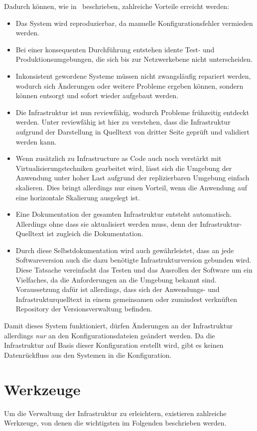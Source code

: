 Dadurch können, wie in~\autocite[64\psqq]{Wolff201604} beschrieben, zahlreiche Vorteile erreicht werden:
\begin{itemize}
    \item Das System wird reproduzierbar, da manuelle Konfigurationsfehler vermieden werden.
    \item Bei einer konsequenten Durchführung entstehen idente Test- und Produktionsumgebungen, die sich bis zur Netzwerkebene nicht unterscheiden.
    \item Inkonsistent gewordene Systeme müssen nicht zwangsläufig repariert werden, wodurch sich Änderungen oder weitere Probleme ergeben können, sondern können entsorgt und sofort wieder aufgebaut werden.
    \item Die Infrastruktur ist nun reviewfähig, wodurch Probleme frühzeitig entdeckt werden. Unter reviewfähig ist hier zu verstehen, dass die Infrastruktur aufgrund der Darstellung in Quelltext von dritter Seite geprüft und validiert werden kann.
    \item Wenn zusätzlich zu Infrastructure as Code auch noch verstärkt mit Virtualisierungstechniken gearbeitet wird, lässt sich die Umgebung der Anwendung unter hoher Last aufgrund der replizierbaren Umgebung einfach skalieren. Dies bringt allerdings nur einen Vorteil, wenn die Anwendung auf eine horizontale Skalierung ausgelegt ist.
    \item Eine Dokumentation der gesamten Infrastruktur entsteht automatisch. Allerdings ohne dass sie aktualisiert werden muss, denn der Infrastruktur-Quelltext ist zugleich die Dokumentation.
    \item Durch diese Selbstdokumentation wird auch gewährleistet, dass an jede Softwareversion auch die dazu benötigte Infrastrukturversion gebunden wird. Diese Tatsache vereinfacht das Testen und das Ausrollen der Software um ein Vielfaches, da die Anforderungen an die Umgebung bekannt sind. Voraussetzung dafür ist allerdings, dass sich der Anwendungs- und Infrastrukturquelltext in einem gemeinsamen oder zumindest verknüften Repository der Versionsverwaltung befinden.
\end{itemize}
Damit dieses System funktioniert, dürfen Änderungen an der Infrastruktur allerdings \emph{nur} an den Konfigurationsdateien geändert werden. Da die Infrastruktur auf Basis dieser Konfiguration erstellt wird, gibt es keinen Datenrückfluss aus den Systemen in die Konfiguration.


\section{Werkzeuge}
\label{sec:konfigurationswerkzeuge}
Um die Verwaltung der Infrastruktur zu erleichtern, existieren zahlreiche Werkzeuge, von denen die wichtigsten im Folgenden beschrieben werden.

